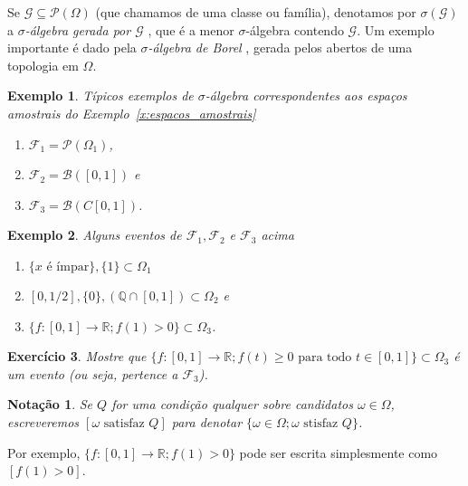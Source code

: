 \documentclass[reqno, draft]{book}
\newcommand*\1{\mathds{1}}
\newtheorem{notation}[theorem]{Notação}
\newtheorem{example}{Exemplo}[section]
\newtheorem{exercise}[example]{Exercício}
\begin{document}
Se $\mathcal{G} \subseteq \mathcal{P}(\Omega)$ (que chamamos de uma classe ou família), denotamos por $\sigma(\mathcal{G})$ a \emph{$\sigma$-álgebra gerada por $\mathcal{G}$} , que é a menor $\sigma$-álgebra contendo $\mathcal{G}$.
Um exemplo importante é dado pela \emph{$\sigma$-álgebra de Borel} , gerada pelos abertos de uma topologia em $\Omega$.

\begin{example} Típicos exemplos de $\sigma$-álgebra correspondentes aos espaços amostrais do Exemplo~\ref{x:espacos_amostrais}
  \begin{enumerate}[\quad a)]
  \item $\mathcal{F}_1 = \mathcal{P}(\Omega_1)$,
  \item $\mathcal{F}_2 = \mathcal{B}([0,1])$ e
  \item $\mathcal{F}_3 = \mathcal{B}(C[0,1])$.
  \end{enumerate}
\end{example}

\begin{example} Alguns eventos de $\mathcal{F}_1, \mathcal{F}_2$ e $\mathcal{F}_3$ acima
  \begin{enumerate}[\quad a)]
  \item $\{\text{$x$ é ímpar}\}, \{1\} \subset \Omega_1$
  \item $[0,1/2], \{0\}, (\mathbb{Q} \cap [0,1]) \subset \Omega_2$ e
  \item $\{f:[0,1] \to \mathbb{R}; f(1) > 0\} \subset \Omega_3$.
  \end{enumerate}
\end{example}

\begin{exercise}
  Mostre que $\{f:[0,1] \to \mathbb{R}; f(t) \geq 0 \text{ para todo $t \in [0,1]$}\} \subset \Omega_3$ é um evento (ou seja, pertence a $\mathcal{F}_3$).
\end{exercise}

\begin{notation}
  Se $Q$ for uma condição qualquer sobre candidatos $\omega \in \Omega$, escreveremos $[\text{$\omega$ satisfaz $Q$}]$  para denotar $\{\omega \in \Omega; \text{$\omega$ stisfaz $Q$}\}$.
\end{notation}

Por exemplo, $\{f:[0,1] \to \mathbb{R}; f(1) > 0\}$ pode ser escrita simplesmente como $[f(1) > 0]$.
\end{document}
